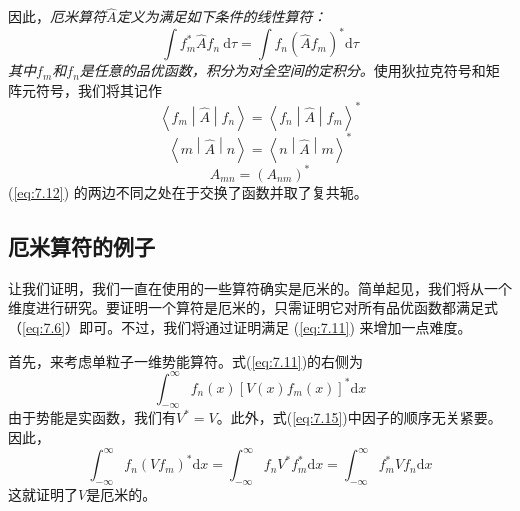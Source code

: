     因此，\textit{厄米算符$\hat{A}$定义为满足如下条件的线性算符：}
    \begin{equation}
        \boxed{
            \int f^{\ast}_m \hat{A} f_n \:\mathrm{d}\tau = \int f_n \left(\hat{A} f_m\right)^{\ast} \mathrm{d}\tau
        }
        \label{eq:7.11}
    \end{equation}
    \textit{其中$f_m$和$f_n$是任意的品优函数，积分为对全空间的定积分。}使用狄拉克符号和矩阵元符号，我们将其记作
    \begin{equation}
        \boxed{
            \left\langle f_m \middle| \hat{A} \middle| f_n \right\rangle = \left\langle f_n \middle| \hat{A} \middle| f_m \right\rangle^{\ast}
        }
        \label{eq:7.12}
    \end{equation}
    \begin{equation}
        \boxed{
            \left\langle m \middle| \hat{A} \middle| n \right\rangle = \left\langle n \middle| \hat{A} \middle| m \right\rangle^{\ast}
        }
        \label{eq:7.13}
    \end{equation}
    \begin{equation}
        \boxed{
            A_{mn} = \left(A_{nm}\right)^{\ast}
        }
        \label{eq:7.14}
    \end{equation}
    (\ref{eq:7.12}) 的两边不同之处在于交换了函数并取了复共轭。

\subsection*{厄米算符的例子}

    让我们证明，我们一直在使用的一些算符确实是厄米的。简单起见，我们将从一个维度进行研究。要证明一个算符是厄米的，只需证明它对所有品优函数都满足式（\ref{eq:7.6}）即可。不过，我们将通过证明满足 (\ref{eq:7.11}) 来增加一点难度。

    首先，来考虑单粒子一维势能算符。式(\ref{eq:7.11})的右侧为
    \begin{equation}
        \int_{-\infty}^{\infty} f_n\left(x\right)\left[V\left(x\right)f_m\left(x\right)\right]^{\ast} \mathrm{d}x
        \label{eq:7.15}
    \end{equation}
    由于势能是实函数，我们有$V^{\ast} = V$。此外，式(\ref{eq:7.15})中因子的顺序无关紧要。因此，
    \begin{equation*}
        \int_{-\infty}^{\infty} f_n\left(Vf_m\right)^{\ast} \mathrm{d}x = \int_{-\infty}^{\infty} f_n V^{\ast} f^{\ast}_m \mathrm{d}x = \int_{-\infty}^{\infty} f_m^{\ast} V f_n \mathrm{d}x
    \end{equation*}
    这就证明了$V$是厄米的。

